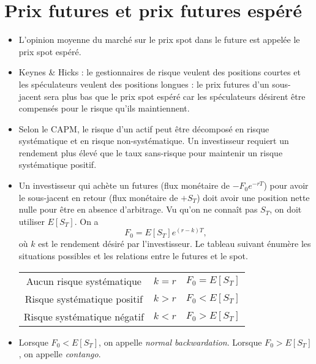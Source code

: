 \section{Prix futures et prix futures espéré}

\begin{itemize}
	\item L'opinion moyenne du marché sur le prix spot dans le future est appelée le prix spot espéré.
	\item Keynes \& Hicks : le gestionnaires de risque veulent des positions courtes et les spéculateurs veulent des positions longues : le prix futures d'un sous-jacent sera plus bas que le prix spot espéré car les spéculateurs désirent être compensés pour le risque qu'ils maintiennent. 
	\item Selon le CAPM, le risque d'un actif peut être décomposé en risque systématique et en risque non-systématique. Un investisseur requiert un rendement plus élevé que le taux sans-risque pour maintenir un risque systématique positif. 
	\item Un investisseur qui achète un futures (flux monétaire de $-F_0 e^{-rT}$) pour avoir le sous-jacent en retour (flux monétaire de $+S_T$) doit avoir une position nette nulle pour être en absence d'arbitrage. Vu qu'on ne connaît pas $S_T$, on doit utiliser $E[S_T]$. On a 
	$$F_0 = E[S_T]e^{(r-k)T},$$
	où $k$ est le rendement désiré par l'investisseur. Le tableau suivant énumère les situations possibles et les relations entre le futures et le spot. \\
	\begin{center}
		\begin{tabular}{ccc}
			 Aucun risque systématique  & $k=r$ & $F_0 = E[S_T]$ \\
			Risque systématique positif & $k>r$ & $F_0 < E[S_T]$ \\
			Risque systématique négatif & $k<r$ & $F_0 > E[S_T]$
		\end{tabular} 
	\end{center}
	\item Lorsque $F_0 < E[S_T]$, on appelle \textit{normal backwardation}. Lorsque $F_0 > E[S_T]$, on appelle \textit{contango}. 
\end{itemize}

